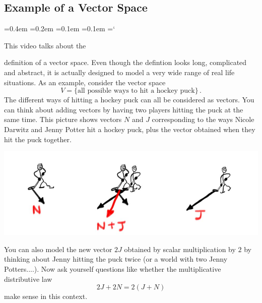 
\subsection*{Example of a Vector Space}

{\ttfamily
{}\font=0.4em
\font=0.2em
\font=0.1em
\font=0.1em
\hyphenchar\font=`\-


\hypertarget{scripts_vector_spaces_example}{This video talks about the} definition  of
a vector space. Even though the defintion looks long, complicated and abstract, it is actually
designed to model a very wide range of real life situations. As an example, consider the vector space
\[
V=\{\text{all possible ways to hit a hockey puck}\}\, .
\]
The different ways of hitting a hockey puck can all be considered as vectors. You can think about adding vectors
by having two players hitting the puck at the same time. This picture shows vectors $N$ and $J$ corresponding to the 
ways Nicole Darwitz and Jenny Potter hit a hockey puck, plus the vector obtained when they hit the puck together.
\begin{center}
\includegraphics[scale=.35]{hockey.jpg}
\end{center}
You can also model the new  vector $2J$ obtained by scalar multiplication by $2$ by thinking about Jenny hitting the puck twice
(or a world with two Jenny Potters....). Now ask yourself questions like whether the multiplicative distributive law
\[2J + 2N = 2(J+N)\]
make sense in this context.





}


